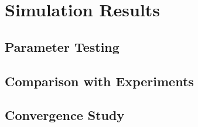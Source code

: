 \newpage
\chapter{Simulation Results}
\section{Parameter Testing}
\section{Comparison with Experiments}
\section{Convergence Study}
